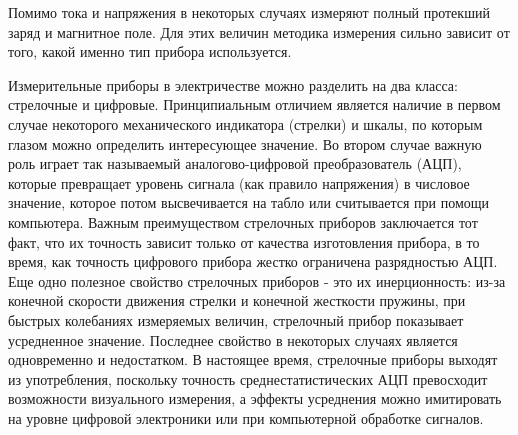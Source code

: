 Помимо тока и напряжения в некоторых случаях измеряют полный протекший заряд и магнитное поле. Для этих величин методика измерения сильно зависит от того, какой именно тип прибора используется.

Измерительные приборы в электричестве можно разделить на два класса: стрелочные и цифровые. Принципиальным отличием является наличие в первом случае некоторого механического индикатора (стрелки) и шкалы, по которым глазом можно определить интересующее значение. Во втором случае важную роль играет так называемый аналогово-цифровой преобразователь (АЦП), которые превращает уровень сигнала (как правило напряжения) в числовое значение, которое потом высвечивается на табло или считывается при помощи компьютера. Важным преимуществом стрелочных приборов заключается тот факт, что их точность зависит только от качества изготовления прибора, в то время, как точность цифрового прибора жестко ограничена разрядностью АЦП. Еще одно полезное свойство стрелочных приборов - это их инерционность: из-за конечной скорости движения стрелки и конечной жесткости пружины, при быстрых колебаниях измеряемых величин, стрелочный прибор показывает усредненное значение. Последнее свойство в некоторых случаях является одновременно и недостатком. В настоящее время, стрелочные приборы выходят из употребления, поскольку точность среднестатистических АЦП превосходит возможности визуального измерения, а эффекты усреднения можно имитировать на уровне цифровой электроники или при компьютерной обработке сигналов.